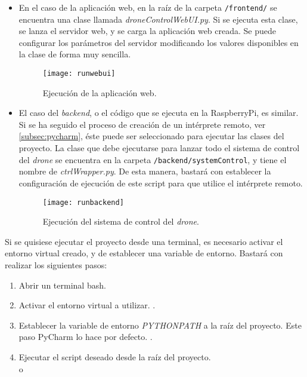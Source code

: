 \begin{itemize}
\item En el caso de la aplicación web, en la raíz de la carpeta \texttt{/frontend/} se encuentra una clase llamada \emph{droneControlWebUI.py}. Si se ejecuta esta clase, se lanza el servidor web, y se carga la aplicación web creada. Se puede configurar los parámetros del servidor modificando los valores disponibles en la clase de forma muy sencilla.
\begin{figure}
	\centering
	\texttt{[image: runwebui]}
	\caption[Ejecución de aplicación web]{Ejecución de la aplicación web.}\label{fig:runwebui}
\end{figure}

\item El caso del \emph{backend}, o el código que se ejecuta en la RaspberryPi, es similar. Si se ha seguido el proceso de creación de un intérprete remoto, ver \ref{subsec:pycharm}, éste puede ser seleccionado para ejecutar las clases del proyecto. La clase que debe ejecutarse para lanzar todo el sistema de control del \emph{drone} se encuentra en la carpeta \texttt{/backend/systemControl}, y tiene el nombre de \emph{ctrlWrapper.py}. De esta manera, bastará con establecer la configuración de ejecución de este script para que utilice el intérprete remoto.

\begin{figure}
	\centering
	\texttt{[image: runbackend]}
	\caption[Ejecución del sistema de control]{Ejecución del sistema de control del \emph{drone}.}\label{fig:runbackend}
\end{figure}
\end{itemize}

Si se quisiese ejecutar el proyecto desde una terminal, es necesario activar el entorno virtual creado, y de establecer una variable de entorno. Bastará con realizar los siguientes pasos:

\begin{enumerate}
\item Abrir un terminal bash.
\item Activar el entorno virtual a utilizar. .
\item Establecer la variable de entorno \emph{PYTHONPATH} a la raíz del proyecto. Este paso PyCharm lo hace por defecto. .
\item Ejecutar el script deseado desde la raíz del proyecto.\\  o \\ 
\end{enumerate}

